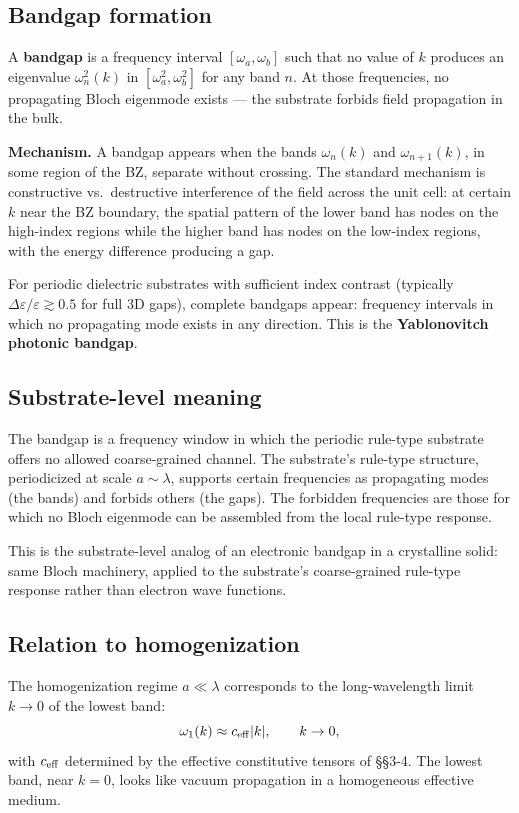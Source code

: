 \documentclass[11pt,a4paper]{article}
\begin{document}
\subsection{Bandgap formation}

A \textbf{bandgap} is a frequency interval $[\omega_a, \omega_b]$ such that no value of $k$ produces an eigenvalue $\omega_n^2(k)$ in $[\omega_a^2, \omega_b^2]$ for any band $n$. At those frequencies, no propagating Bloch eigenmode exists --- the substrate forbids field propagation in the bulk.

\textbf{Mechanism.} A bandgap appears when the bands $\omega_n(k)$ and $\omega_{n+1}(k)$, in some region of the BZ, separate without crossing. The standard mechanism is constructive vs.\ destructive interference of the field across the unit cell: at certain $k$ near the BZ boundary, the spatial pattern of the lower band has nodes on the high-index regions while the higher band has nodes on the low-index regions, with the energy difference producing a gap.

For periodic dielectric substrates with sufficient index contrast (typically $\Delta\varepsilon/\varepsilon \gtrsim 0.5$ for full 3D gaps), complete bandgaps appear: frequency intervals in which no propagating mode exists in any direction. This is the \textbf{Yablonovitch photonic bandgap}.

\subsection{Substrate-level meaning}

The bandgap is a frequency window in which the periodic rule-type substrate offers no allowed coarse-grained channel. The substrate's rule-type structure, periodicized at scale $a \sim \lambda$, supports certain frequencies as propagating modes (the bands) and forbids others (the gaps). The forbidden frequencies are those for which no Bloch eigenmode can be assembled from the local rule-type response.

This is the substrate-level analog of an electronic bandgap in a crystalline solid: same Bloch machinery, applied to the substrate's coarse-grained rule-type response rather than electron wave functions.

\subsection{Relation to homogenization}

The homogenization regime $a \ll \lambda$ corresponds to the long-wavelength limit $k \to 0$ of the lowest band:
\[
\omega_1(k) \approx c_{\rm eff}|k|, \qquad k \to 0,
\]
with $c_{\rm eff}$ determined by the effective constitutive tensors of \S\S3-4. The lowest band, near $k = 0$, looks like vacuum propagation in a homogeneous effective medium.
\end{document}
